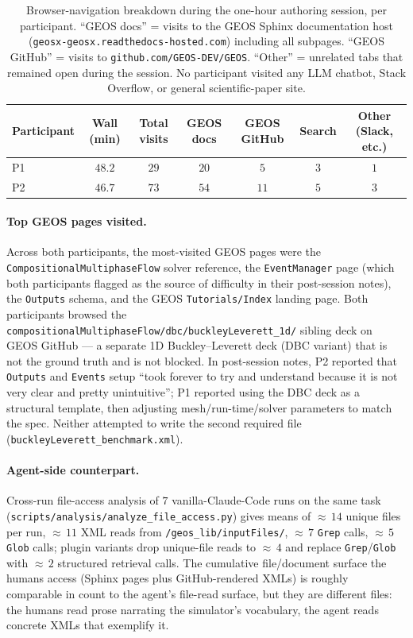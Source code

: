 \documentclass{article}
\begin{document}
\begin{table}[h]
  \caption{Browser-navigation breakdown during the one-hour authoring session, per participant. ``GEOS docs'' = visits to the GEOS Sphinx documentation host (\texttt{geosx-geosx.readthedocs-hosted.com}) including all subpages. ``GEOS GitHub'' = visits to \texttt{github.com/GEOS-DEV/GEOS}. ``Other'' = unrelated tabs that remained open during the session. No participant visited any LLM chatbot, Stack Overflow, or general scientific-paper site.}
  \label{tab:human-browser}
  \centering
  \small
  \begin{tabular}{lcccccc}
    \toprule
    \textbf{Participant} & \textbf{Wall (min)} & \textbf{Total visits} & \textbf{GEOS docs} & \textbf{GEOS GitHub} & \textbf{Search} & \textbf{Other (Slack, etc.)} \\
    \midrule
    P1 & $48.2$ & $29$ & $20$ & $5$ & $3$ & $1$ \\
    P2 & $46.7$ & $73$ & $54$ & $11$ & $5$ & $3$ \\
    \bottomrule
  \end{tabular}
\end{table}

\paragraph{Top GEOS pages visited.} Across both participants, the most-visited GEOS pages were the \texttt{CompositionalMultiphaseFlow} solver reference, the \texttt{EventManager} page (which both participants flagged as the source of difficulty in their post-session notes), the \texttt{Outputs} schema, and the GEOS \texttt{Tutorials/Index} landing page. Both participants browsed the \texttt{compositionalMultiphaseFlow/dbc/buckleyLeverett\_1d/} sibling deck on GEOS GitHub --- a separate 1D Buckley--Leverett deck (DBC variant) that is not the ground truth and is not blocked. In post-session notes, P2 reported that \texttt{Outputs} and \texttt{Events} setup ``took forever to try and understand because it is not very clear and pretty unintuitive''; P1 reported using the DBC deck as a structural template, then adjusting mesh/run-time/solver parameters to match the spec. Neither attempted to write the second required file (\texttt{buckleyLeverett\_benchmark.xml}).

\paragraph{Agent-side counterpart.} Cross-run file-access analysis of $7$ vanilla-Claude-Code runs on the same task (\texttt{scripts/analysis/analyze\_file\_access.py}) gives means of ${\approx}\,14$ unique files per run, ${\approx}\,11$ XML reads from \texttt{/geos\_lib/inputFiles/}, ${\approx}\,7$ \texttt{Grep} calls, ${\approx}\,5$ \texttt{Glob} calls; plugin variants drop unique-file reads to ${\approx}\,4$ and replace \texttt{Grep}/\texttt{Glob} with ${\approx}\,2$ structured retrieval calls. The cumulative file/document surface the humans access (Sphinx pages plus GitHub-rendered XMLs) is roughly comparable in count to the agent's file-read surface, but they are different files: the humans read prose narrating the simulator's vocabulary, the agent reads concrete XMLs that exemplify it.
\end{document}

